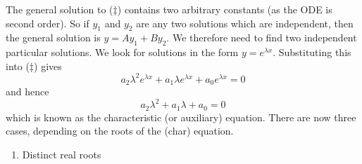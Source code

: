 \documentclass[10pt, a4paper]{article}
\begin{document}
The general solution to ($\ddagger$) contains two arbitrary constants
(as the ODE is second order).
So if $y_1$ and $y_2$ are any two solutions which are independent,
then the general solution is $y = Ay_1 + By_2$.
We therefore need to find two independent particular solutions.
We look for solutions in the form $y = e ^ {\lambda x}$.
Substituting this into ($\ddagger$) gives
\[
a_2\lambda ^ 2e ^ {\lambda x} + a_1\lambda e ^ {\lambda x} + a_0e ^ {\lambda x} = 0
\]
and hence
\begin{equation}\tag{Char}
    a_2\lambda ^ 2 + a_1\lambda + a_0 = 0
\end{equation}
which is known as the characteristic
(or auxiliary)
equation.
There are now three cases,
depending on the roots of the (char) equation.
\begin{enumerate}[label = \roman*)]
    \item Distinct real roots


\end{enumerate}
\end{document}
